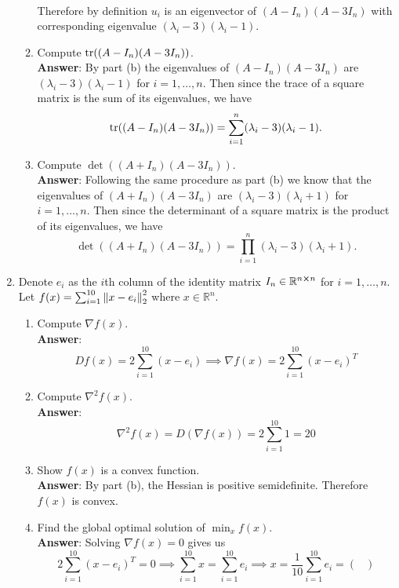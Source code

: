\documentclass{article}
\begin{document}
\begin{enumerate}
\begin{enumerate}
\begin{align*}
                    \end{align*}
                    Therefore by definition $u_i$ is an eigenvector of $(A-I_n)(A-3I_n)$ with corresponding eigenvalue $(\lambda_i-3)(\lambda_i-1)$.
              \item Compute $\tr((A-I_n)(A-3I_n))$.\\
                    \textbf{Answer}: By part (b) the eigenvalues of $(A-I_n)(A-3I_n)$ are $(\lambda_i-3)(\lambda_i-1)$ for $i=1,\ldots,n$. Then since the trace of a square matrix is the sum of its eigenvalues, we have \[\tr((A-I_n)(A-3I_n))=\sum_{i=1}^n(\lambda_i-3)(\lambda_i-1).\]
              \item Compute $\det((A+I_n)(A-3I_n))$.\\
                    \textbf{Answer}: Following the same procedure as part (b) we know that the eigenvalues of $(A+I_n)(A-3I_n)$ are $(\lambda_i-3)(\lambda_i+1)$ for $i=1,\ldots,n$. Then since the determinant of a square matrix is the product of its eigenvalues, we have \[\det((A+I_n)(A-3I_n))=\prod_{i=1}^n(\lambda_i-3)(\lambda_i+1).\]
          \end{enumerate}
          \newpage
    \item Denote $e_i$ as the $i$th column of the identity matrix $I_n\in\mathbb{R}^{n\cross n}$ for $i=1,\ldots,n$. Let $f(x)=\sum_{i=1}^{10}\norm{x-e_i}_2^2$ where $x\in\mathbb{R}^n$.
          \begin{enumerate}
              \item Compute $\nabla f(x)$.\\
                    \textbf{Answer}: \[
                        Df(x)=2\sum_{i=1}^{10}(x-e_i)\implies\nabla f(x)=2\sum_{i=1}^{10}(x-e_i)^T
                    \]
              \item Compute $\nabla^2 f(x)$.\\
                    \textbf{Answer}: \[
                        \nabla^2 f(x)=D(\nabla f(x))=2\sum_{i=1}^{10}1=20
                    \]
              \item Show $f(x)$ is a convex function.\\
                    \textbf{Answer}: By part (b), the Hessian is positive semidefinite. Therefore $f(x)$ is convex.
              \item Find the global optimal solution of $\min_xf(x)$.\\
                    \textbf{Answer}: Solving $\nabla f(x)=0$ gives us \[
                        2\sum_{i=1}^{10}(x-e_i)^T=0\implies\sum_{i=1}^{10}x=\sum_{i=1}^{10}e_i\implies x=\frac{1}{10}\sum_{i=1}^{10}e_i=\begin{pmatrix}

\end{pmatrix}\]
\end{enumerate}
\end{enumerate}
\end{document}
